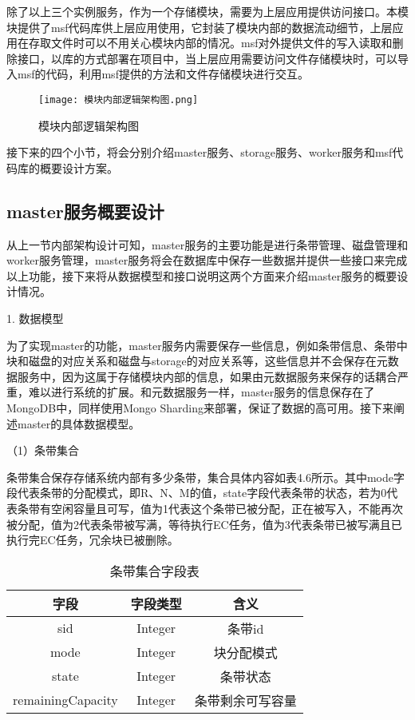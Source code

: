 除了以上三个实例服务，作为一个存储模块，需要为上层应用提供访问接口。本模块提供了msf代码库供上层应用使用，它封装了模块内部的数据流动细节，上层应用在存取文件时可以不用关心模块内部的情况。msf对外提供文件的写入读取和删除接口，以库的方式部署在项目中，当上层应用需要访问文件存储模块时，可以导入msf的代码，利用msf提供的方法和文件存储模块进行交互。

\begin{figure}[h]
  \centering
  \texttt{[image: 模块内部逻辑架构图.png]}
  \caption{模块内部逻辑架构图}
\end{figure}

接下来的四个小节，将会分别介绍master服务、storage服务、worker服务和msf代码库的概要设计方案。

\subsection{master服务概要设计}

从上一节内部架构设计可知，master服务的主要功能是进行条带管理、磁盘管理和worker服务管理，master服务将会在数据库中保存一些数据并提供一些接口来完成以上功能，接下来将从数据模型和接口说明这两个方面来介绍master服务的概要设计情况。\newline

1. 数据模型

为了实现master的功能，master服务内需要保存一些信息，例如条带信息、条带中块和磁盘的对应关系和磁盘与storage的对应关系等，这些信息并不会保存在元数据服务中，因为这属于存储模块内部的信息，如果由元数据服务来保存的话耦合严重，难以进行系统的扩展。和元数据服务一样，master服务的信息保存在了MongoDB中，同样使用Mongo Sharding来部署，保证了数据的高可用。接下来阐述master的具体数据模型。

（1）条带集合

条带集合保存存储系统内部有多少条带，集合具体内容如表4.6所示。其中mode字段代表条带的分配模式，即R、N、M的值，state字段代表条带的状态，若为0代表条带有空闲容量且可写，值为1代表这个条带已被分配，正在被写入，不能再次被分配，值为2代表条带被写满，等待执行EC任务，值为3代表条带已被写满且已执行完EC任务，冗余块已被删除。

\begin{table}[h]
    \centering
    \caption{条带集合字段表}
    \begin{tabular}{ccc}
      \toprule
      字段   & 字段类型   & 含义                          \\
      \midrule
      sid               & Integer   & 条带id             \\
      mode              & Integer   & 块分配模式          \\
      state             & Integer   & 条带状态            \\
      remainingCapacity & Integer   & 条带剩余可写容量     \\
      \bottomrule
    \end{tabular}
\end{table}

